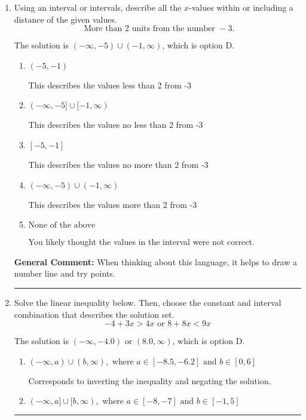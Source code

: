\documentclass{extbook}[14pt]
\newcommand{\litem}[1]{\item #1

\rule{\textwidth}{0.4pt}}
\begin{document}
\begin{enumerate}
{\begin{enumerate}[label=\Alph*.]
 $(-1.223, \infty)$, which corresponds to negating the endpoint of the solution.
\item \( \text{None of the above}. \)

You may have chosen this if you thought the inequality did not match the ends of the intervals.
\end{enumerate}

\textbf{General Comment:} Remember that less/greater than or equal to includes the endpoint, while less/greater do not. Also, remember that you need to flip the inequality when you multiply or divide by a negative.
}
\litem{
Using an interval or intervals, describe all the $x$-values within or including a distance of the given values.
\[ \text{ More than } 2 \text{ units from the number } -3. \]

The solution is \( (-\infty, -5) \cup (-1, \infty) \), which is option D.\begin{enumerate}[label=\Alph*.]
\item \( (-5, -1) \)

This describes the values less than 2 from -3
\item \( (-\infty, -5] \cup [-1, \infty) \)

This describes the values no less than 2 from -3
\item \( [-5, -1] \)

This describes the values no more than 2 from -3
\item \( (-\infty, -5) \cup (-1, \infty) \)

This describes the values more than 2 from -3
\item \( \text{None of the above} \)

You likely thought the values in the interval were not correct.
\end{enumerate}

\textbf{General Comment:} When thinking about this language, it helps to draw a number line and try points.
}
\litem{
Solve the linear inequality below. Then, choose the constant and interval combination that describes the solution set.
\[ -4 + 3 x > 4 x \text{ or } 8 + 8 x < 9 x \]

The solution is \( (-\infty, -4.0) \text{ or } (8.0, \infty) \), which is option D.\begin{enumerate}[label=\Alph*.]
\item \( (-\infty, a) \cup (b, \infty), \text{ where } a \in [-8.5, -6.2] \text{ and } b \in [0, 6] \)

Corresponds to inverting the inequality and negating the solution.
\item \( (-\infty, a] \cup [b, \infty), \text{ where } a \in [-8, -7] \text{ and } b \in [-1, 5] \)


\end{enumerate}}
\end{enumerate}
\end{document}
